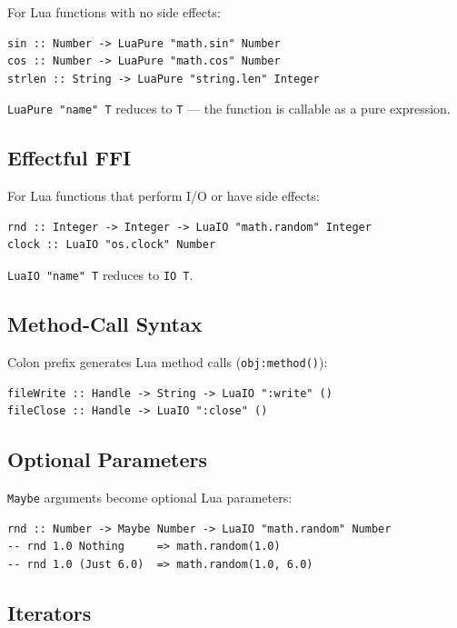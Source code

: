 \documentclass[11pt,a4paper]{article}
\begin{document}
For Lua functions with no side effects:

\begin{lstlisting}
sin :: Number -> LuaPure "math.sin" Number
cos :: Number -> LuaPure "math.cos" Number
strlen :: String -> LuaPure "string.len" Integer
\end{lstlisting}

\texttt{LuaPure "name" T} reduces to \texttt{T} --- the function is
callable as a pure expression.

\subsection{Effectful FFI}

For Lua functions that perform I/O or have side effects:

\begin{lstlisting}
rnd :: Integer -> Integer -> LuaIO "math.random" Integer
clock :: LuaIO "os.clock" Number
\end{lstlisting}

\texttt{LuaIO "name" T} reduces to \texttt{IO T}.

\subsection{Method-Call Syntax}

Colon prefix generates Lua method calls (\texttt{obj:method()}):

\begin{lstlisting}
fileWrite :: Handle -> String -> LuaIO ":write" ()
fileClose :: Handle -> LuaIO ":close" ()
\end{lstlisting}

\subsection{Optional Parameters}

\texttt{Maybe} arguments become optional Lua parameters:

\begin{lstlisting}
rnd :: Number -> Maybe Number -> LuaIO "math.random" Number
-- rnd 1.0 Nothing     => math.random(1.0)
-- rnd 1.0 (Just 6.0)  => math.random(1.0, 6.0)
\end{lstlisting}

\subsection{Iterators}
\end{document}
